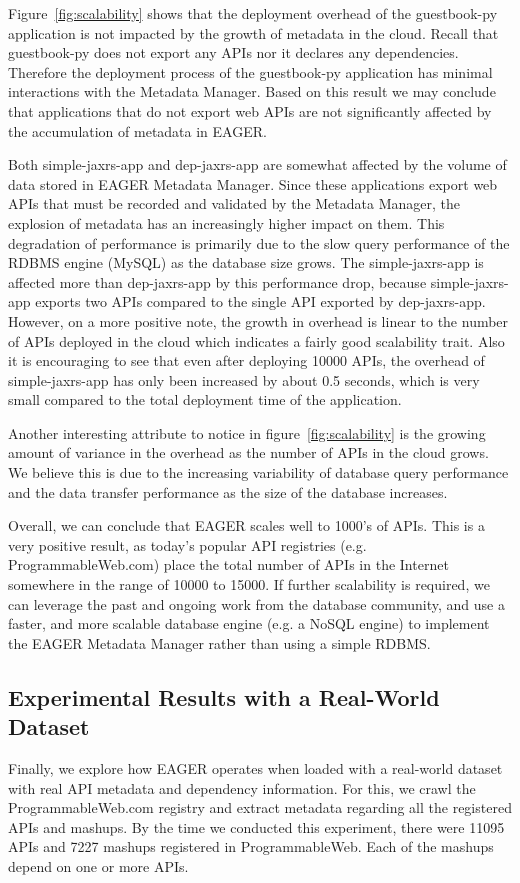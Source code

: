 Figure~\ref{fig:scalability} shows that the deployment overhead of the guestbook-py application is not impacted by the growth of metadata
in the cloud. Recall that guestbook-py does not export any APIs nor it declares any dependencies. Therefore the deployment process of
the guestbook-py application has minimal interactions with the Metadata Manager. Based on this result we may conclude that applications that
do not export web APIs are not significantly affected by the accumulation of metadata in EAGER.

Both simple-jaxrs-app and dep-jaxrs-app are
somewhat affected by the volume of data stored in EAGER Metadata Manager. Since these applications export web APIs that must be 
recorded and validated by the Metadata Manager, the explosion of metadata has an increasingly higher impact on them. This degradation 
of performance is primarily due to the slow query performance of the RDBMS engine (MySQL) as the database size grows. The simple-jaxrs-app
is affected more than dep-jaxrs-app by this performance drop, because simple-jaxrs-app exports two APIs compared to the single API exported 
by dep-jaxrs-app. However, on a more positive note, the growth
in overhead is linear to the number of APIs deployed in the cloud which indicates a fairly good scalability trait. Also it is encouraging to see that
even after deploying 10000 APIs, the overhead of simple-jaxrs-app has only been increased by about 0.5 seconds, which is very small compared
to the total deployment time of the application.

Another interesting attribute to notice in figure~\ref{fig:scalability} is the growing amount of variance in the overhead as the number of APIs in the cloud grows.
We believe this is due to the increasing variability of database query performance and the data transfer performance as the size of the 
database increases.

Overall, we can conclude that EAGER scales well to 1000's of APIs. This is a very positive result, as today's popular API registries (e.g. ProgrammableWeb.com) 
place the total number of APIs in the Internet somewhere in the range of 10000 to 15000. If further scalability is required, we can leverage the past and ongoing
work from the database community, and use a faster, and more scalable database engine (e.g. a NoSQL engine) to implement the
EAGER Metadata Manager rather than using a simple RDBMS.

\subsection{Experimental Results with a Real-World Dataset}
Finally, we explore how EAGER operates when loaded with a real-world dataset with real API metadata and dependency information. For this, we 
crawl the ProgrammableWeb.com registry and extract metadata regarding all the registered APIs and mashups. By the time we conducted
this experiment, there were 11095 APIs and 7227 mashups registered in ProgrammableWeb. Each of the mashups depend on one or more APIs.

